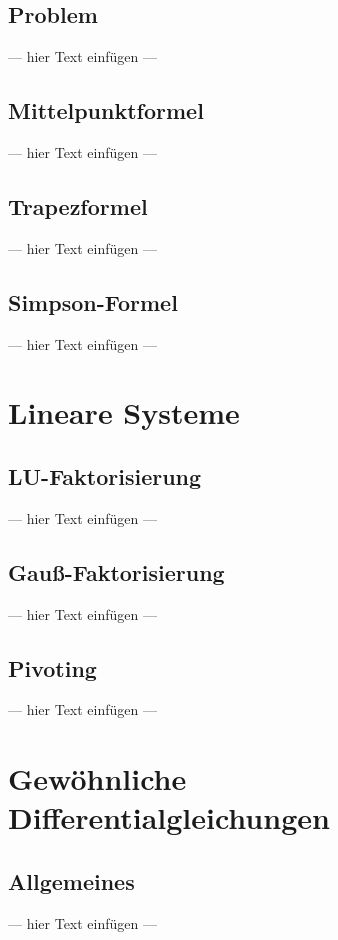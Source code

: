 \documentclass[a4paper, 12pt]{article}
\begin{document}
\subsection{Problem}
--- hier Text einfügen ---


\subsection{Mittelpunktformel}
--- hier Text einfügen ---


\subsection{Trapezformel}
--- hier Text einfügen ---


\subsection{Simpson-Formel}
--- hier Text einfügen ---



\section{Lineare Systeme}


\subsection{LU-Faktorisierung}
--- hier Text einfügen ---


\subsection{Gauß-Faktorisierung}
--- hier Text einfügen ---


\subsection{Pivoting}
--- hier Text einfügen ---



\section{Gewöhnliche Differentialgleichungen}


\subsection{Allgemeines}
--- hier Text einfügen ---
\end{document}
